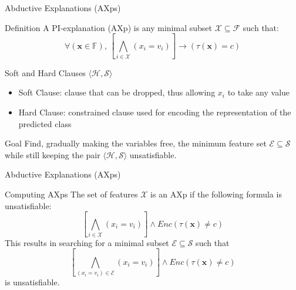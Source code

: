 \begin{frame}{Abductive Explanations (AXps)}
    \footnotesize
    \begin{block}{Definition}
        A PI-explanation (AXp) is any minimal subset  \(\mathcal{X} \subseteq \mathcal{F} \) such that:
        \begin{equation*}
            \forall (\mathbf{x} \in \mathbb{F}), \, \left[ \bigwedge_{i \in \mathcal{X}} (x_i = v_i) \right] \rightarrow (\tau(\mathbf{x}) = c)
        \end{equation*}
    \end{block}
    \begin{block}{Soft and Hard Clauses \(\langle \mathcal{H},\mathcal{S} \rangle\)}
        \begin{itemize}
            \item Soft Clause: clause that can be dropped, thus allowing $x_{i}$ to take any value
            \item Hard Clause: constrained clause used for encoding the representation of the predicted class
        \end{itemize}
    \end{block}
    \begin{block}{Goal}
        Find, gradually making the variables free, the minimum feature set $\mathcal{E} \subseteq \mathcal{S}$ while still keeping the pair $\langle \mathcal{H},\mathcal{S} \rangle$ unsatisfiable.
    \end{block}
\end{frame}

\begin{frame}{Abductive Explanations (AXps)}
    \begin{block}{Computing AXps}
        The set of features $\mathcal{X}$ is an AXp if the following formula is unsatisfiable:
        \begin{equation*}
            \left[ \bigwedge_{i \in \mathcal{X}} (x_i = v_i) \right] \land Enc(\tau(\mathbf{x}) \neq c)
        \end{equation*}
        This results in searching for a minimal subset $\mathcal{E} \subseteq \mathcal{S}$ such that
        \begin{equation*}
            \left[ \bigwedge_{(x_i = v_i) \in \mathcal{E}} (x_i = v_i) \right] \land Enc(\tau(\mathbf{x}) \neq c)
        \end{equation*} 
        is unsatisfiable.
        \vspace{2pt}
    \end{block}
\end{frame}

